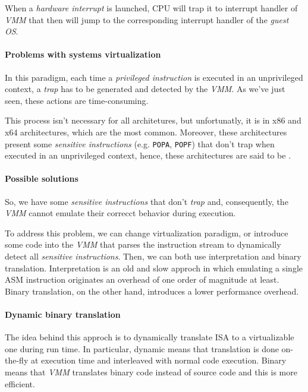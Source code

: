\bigskip\noindent
\begin{minipage}[t]{0.48\textwidth}
    When a \emph{hardware interrupt} is launched, CPU will trap it to interrupt
    handler of \emph{VMM} that then will jump to the corresponding interrupt
    handler of the \emph{guest OS}.
\end{minipage}\hfill
\begin{minipage}[t]{0.48\textwidth}
    \centering
    \strut\vspace*{-\baselineskip}\newline
\end{minipage}

\paragraph{Problems with systems virtualization}
In this paradigm, each time a \emph{privileged instruction} is executed in an
unprivileged context, a \emph{trap} has to be generated and detected by the
\emph{VMM}. As we've just seen, these actions are time-consuming.

This process isn't necessary for all architetures, but unfortunatly,
it is in x86 and x64 architectures, which are the most common. Moreover, these
architectures present some \emph{sensitive instructions} (e.g. \texttt{POPA},
\texttt{POPF}) that don't trap when executed in an unprivileged context, hence,
these architectures are said to be .

\paragraph{Possible solutions}
So, we have some \emph{sensitive instructions} that don't \emph{trap} and,
consequently, the \emph{VMM} cannot emulate their correcct behavior during
execution.

To address this problem, we can change virtualization paradigm, or introduce
some code into the \emph{VMM} that parses the instruction stream to dynamically
detect all \emph{sensitive instructions}. Then, we can both use
interpretation and binary translation. Interpretation is an old and slow approch
in which emulating a single ASM instruction originates an overhead of one order
of magnitude at least. Binary translation, on the other hand, introduces a
lower performance overhead.

\paragraph{Dynamic binary translation}
The idea behind this approch is to dynamically translate 
ISA to a virtualizable one during run time. In particular, dynamic means that
translation is done on-the-fly at execution time and interleaved with normal
code execution. Binary means that \emph{VMM} translates binary code instead of
source code and this is more efficient.


